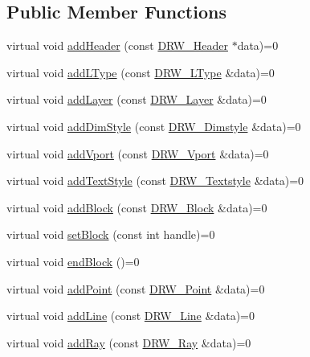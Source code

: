 \subsection*{Public Member Functions}
\begin{DoxyCompactItemize}
\item 
virtual void \hyperlink{classDRW__Interface_a36ca28f76ddb6df58c683f29fc09e5db}{add\-Header} (const \hyperlink{classDRW__Header}{D\-R\-W\-\_\-\-Header} $\ast$data)=0
\item 
virtual void \hyperlink{classDRW__Interface_af0b179fdf1f4717b4ecf7570396ab17c}{add\-L\-Type} (const \hyperlink{classDRW__LType}{D\-R\-W\-\_\-\-L\-Type} \&data)=0
\item 
virtual void \hyperlink{classDRW__Interface_a14d5af0530b9d15c70e06695571f15a7}{add\-Layer} (const \hyperlink{classDRW__Layer}{D\-R\-W\-\_\-\-Layer} \&data)=0
\item 
virtual void \hyperlink{classDRW__Interface_ad9237d153a134b8e41a4e53b8e86dde5}{add\-Dim\-Style} (const \hyperlink{classDRW__Dimstyle}{D\-R\-W\-\_\-\-Dimstyle} \&data)=0
\item 
virtual void \hyperlink{classDRW__Interface_a62940fa7414131514a4eafcc7bb53af7}{add\-Vport} (const \hyperlink{classDRW__Vport}{D\-R\-W\-\_\-\-Vport} \&data)=0
\item 
virtual void \hyperlink{classDRW__Interface_a22da4ebff8bc7c1a426a27803a31b677}{add\-Text\-Style} (const \hyperlink{classDRW__Textstyle}{D\-R\-W\-\_\-\-Textstyle} \&data)=0
\item 
virtual void \hyperlink{classDRW__Interface_ac4e0727bb5223a4974052e20363b6f42}{add\-Block} (const \hyperlink{classDRW__Block}{D\-R\-W\-\_\-\-Block} \&data)=0
\item 
virtual void \hyperlink{classDRW__Interface_a31ea3946aa9e9042e7dc6d1cb37cf60b}{set\-Block} (const int handle)=0
\item 
virtual void \hyperlink{classDRW__Interface_aec16f6683828dbdb703b4b8db640d7a0}{end\-Block} ()=0
\item 
virtual void \hyperlink{classDRW__Interface_af1b9e163c87a3f84a5c06dbc2a6bd18b}{add\-Point} (const \hyperlink{classDRW__Point}{D\-R\-W\-\_\-\-Point} \&data)=0
\item 
virtual void \hyperlink{classDRW__Interface_a6422d075d59ed28408394bc5d68033e1}{add\-Line} (const \hyperlink{classDRW__Line}{D\-R\-W\-\_\-\-Line} \&data)=0
\item 
virtual void \hyperlink{classDRW__Interface_a4718019d01569f13a50a29fcb9ba583f}{add\-Ray} (const \hyperlink{classDRW__Ray}{D\-R\-W\-\_\-\-Ray} \&data)=0

\end{DoxyCompactItemize}
